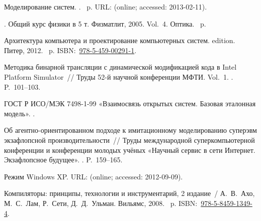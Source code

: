 \begin{thebibliography}{10}
 Моделирование систем. \BibDash
{}. \BibDash
{}~p. \BibDash
\newblock URL:  (online; accessed:
  2013-02-11).

. Общий курс физики в 5 т.
  \BibDash
\newblock Физматлит, 2005. \BibDash
\newblock Vol.~4. Оптика. \BibDash
{}~p.

 {Архитектура
  компьютера и проектирование компьютерных
  систем}. \BibDash
{} edition. \BibDash
\newblock Питер, 2012. \BibDash
{}~p. \BibDash
\newblock
  ISBN:~\href{http://isbndb.com/search-all.html?kw=978-5-459-00291-1}{978-5-459-00291-1}.

 {Методика бинарной
  трансляции с динамической модификацией
  кода в {Intel} {Platform} {Simulator}}~// {Труды 52-й
  научной конференции МФТИ}. \BibDash
\newblock Vol.~1. \BibDash
{}. \BibDash
\newblock P.~101–103.

{ГОСТ Р ИСО/МЭК 7498-1-99 «Взаимосвязь открытых
  систем. Базовая эталонная модель»}. \BibDash
{}.

 {Об
  агентно-ори\-ен\-ти\-ро\-ван\-ном подходе к
  имитационному моделированию суперэвм
  экзафлопсной производительности}~// {Труды
  международной суперкомпьютерной
  конференции и конференции молодых учёных
  «Научный сервис в сети Интернет.
  Экзафлопсное будущее»}. \BibDash
{}. \BibDash
\newblock P.~159–165.

Режим Windows XP. \BibDash
\newblock URL:
  (online; accessed: 2012-09-09).

Компиляторы: принципы, технологии и
  инструментарий, 2 издание~/ А.~В.~Ахо,
  М.~С.~Лам, Р.~Сети, Д.~Д.~Ульман. \BibDash
\newblock Вильямс, 2008. \BibDash
{}~p. \BibDash
\newblock
  ISBN:~\href{http://isbndb.com/search-all.html?kw=978-5-8459-1349-4}{978-5-8459-1349-4}.

\end{thebibliography}
